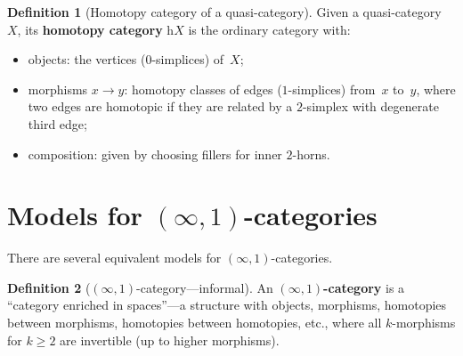 \documentclass[a4paper,12pt]{book}
\theoremstyle{definition}
\newtheorem{definition}{Definition}[section]
\theoremstyle{plain}
\theoremstyle{remark}
\begin{document}
\begin{definition}[Homotopy category of a quasi-category]\label{def:homotopy-cat-qcat}
Given a quasi-category~$X$, its \textbf{homotopy category} $\mathrm{h}X$
is the ordinary category with:
\begin{itemize}
\item objects: the vertices ($0$-simplices) of~$X$;
\item morphisms $x\to y$: homotopy classes of edges ($1$-simplices)
      from~$x$ to~$y$, where two edges are homotopic if they are
      related by a $2$-simplex with degenerate third edge;
\item composition: given by choosing fillers for inner $2$-horns.
\end{itemize}
\end{definition}



\section{Models for $(\infty,1)$-categories}\label{sec:models-infty1}


There are several equivalent models for $(\infty,1)$-categories.

\begin{definition}[$(\infty,1)$-category---informal]\label{def:infty1-informal}
An \textbf{$(\infty,1)$-category} is a ``category enriched in spaces''---a
structure with objects, morphisms, homotopies between morphisms,
homotopies between homotopies, etc., where all $k$-morphisms for $k\ge 2$
are invertible (up to higher morphisms).
\end{definition}
\end{document}
